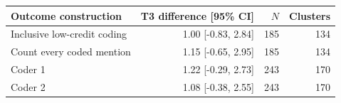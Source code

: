
\begin{tabular}{lrrr}
\toprule
Outcome construction & T3 difference [95\% CI] & $N$ & Clusters\\
\midrule
Inclusive low-credit coding & 1.00 [-0.83, 2.84] & 185 & 134\\
Count every coded mention & 1.15 [-0.65, 2.95] & 185 & 134\\
Coder 1 & 1.22 [-0.29, 2.73] & 243 & 170\\
Coder 2 & 1.08 [-0.38, 2.55] & 243 & 170\\
\bottomrule
\end{tabular}
